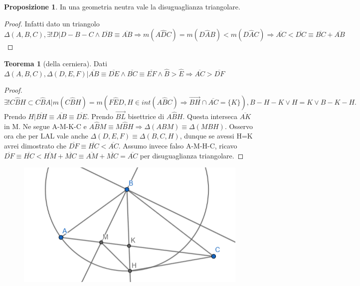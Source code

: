\documentclass[a4paper,10pt]{article}
\theoremstyle{definition}
\theoremstyle{indentdefinition}
\theoremstyle{indentpostulate}
\theoremstyle{indenttheorem}
\newtheorem{thm}{Teorema}[section]
\newtheorem{prop}{Proposizione}[section]
\theoremstyle{myremark}
\theoremstyle{indentgeneral}
\begin{document}
\begin{prop}
    In una geometria neutra vale la disuguaglianza triangolare.
\end{prop}
\begin{proof}
 Infatti dato un triangolo $\Delta (A,B,C), \exists ! D|D-B-C \land \overline{DB} \equiv \overline{AB} \Rightarrow m(A \hat{D} C) =m(D \hat{A}B)<m(D\hat{A}C) \Rightarrow \overline{AC}<\overline{DC} \equiv \overline{BC}+\overline{AB}$ 
\end{proof}

\begin{thm}[della cerniera]
    Dati $\Delta (A,B,C), \Delta (D,E,F)| \overline{AB} \equiv \overline{DE} \land \overline{BC} \equiv \overline{EF} \land \hat{B}>\hat{E} \Rightarrow \overline{AC}> \overline{DF}$
\end{thm}

\begin{proof}   $\exists ! C\hat{B}H \subset C\hat{B}A |m(C \hat{B}H)=m(F\hat{E}D, H \in int(A\hat{B}C) \Rightarrow \overrightarrow{BH} \cap \overline{AC}= \{ K \}), B-H-K \lor H=K \lor B-K-H.$ Prendo $H|\overline{BH} \equiv \overline{AB} \equiv \overline{DE}.$ Prendo $\overrightarrow{BL}$ bisettrice di $A \hat{B} H.$ Questa interseca $\overline{AK}$ in M. Ne segue A-M-K-C e $A \hat{B}M \equiv M \hat{B}H \Rightarrow \Delta (ABM) \equiv \Delta (MBH)$. Osservo ora che per LAL vale anche $\Delta (D,E,F) \equiv \Delta (B,C,H)$, dunque se avessi H=K avrei dimostrato che $\overline{DF} \equiv \overline{HC} <\overline{AC}$. Assumo invece falso A-M-H-C, ricavo $\overline{DF} \equiv \overline{HC} < \overline{HM}+\overline{MC} \equiv \overline{AM}+\overline{MC}=\overline{AC}$ per disuguaglianza triangolare.   \end{proof} 

\begin{figure}[H]
    \centering
    \includegraphics[scale=0.5]{Triangoli2.png}
\end{figure}
\end{document}
